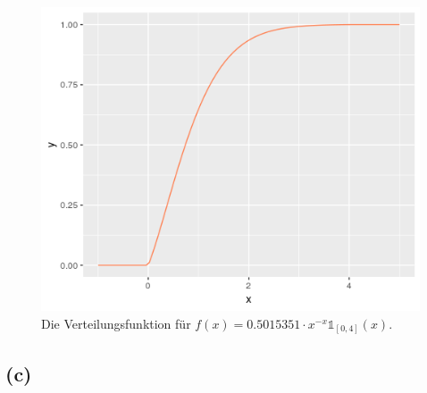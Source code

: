 \documentclass[a4paper]{scrartcl}
\begin{document}
\begin{figure}[H]
	\includegraphics*[scale = 1]{blatt_4_2b.png}
	\caption{Die Verteilungsfunktion für $f(x) = 0.5015351 \cdot x^{-x} \mathds{1}_{\left[0,4\right]}(x)$.}
\end{figure}



\subsection*{(c)}
\end{document}
